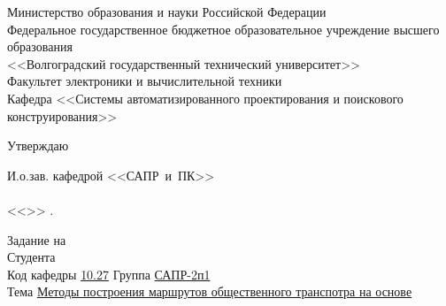 \begin{titlepage}
    \begin{center}
        Министерство образования и науки Российской Федерации \\
        \vspace{.5cm}
        Федеральное государственное бюджетное образовательное учреждение высшего образования\\
        <<Волгоградский государственный технический университет>>\\
        Факультет электроники и вычислительной техники\\
        \vspace{.5cm}
        Кафедра <<Системы автоматизированного проектирования и поискового конструирования>>
        \vspace{.5cm}
    \end{center}
    \begin{flushright}
        \begin{center}
            \hspace*{10.5em}Утверждаю
        \end{center}
        И.о.зав. кафедрой <<САПР~и~ПК>>\\
        \quad{}\\
        <<\underline{\hspace{2em}}>> \underline{\hspace{8em}} \the{}.
    \end{flushright}
    Задание на 
        {}\\
    Студента \\
    Код кафедры \vspace{1em}\underline{\hspace{2em}10.27\hspace{5em}}\quad\qquad
    Группа \underline{\hspace{3em}САПР-2п1\hspace{4.8em}}\\
    Тема \vspace{0.5em}\underline{Методы построения маршрутов общественного транспотра на основе\hspace{1.2em}}\\

\end{titlepage}

